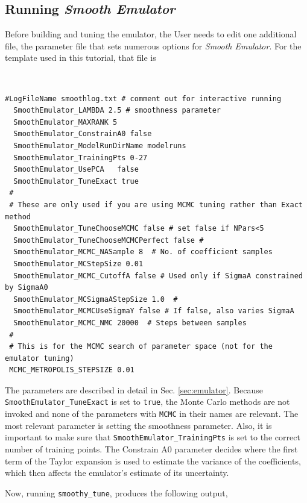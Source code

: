 \documentclass[UserManual.tex]{subfiles}
\begin{document}
\subsection{Running {\it Smooth Emulator}}
Before building and tuning the emulator, the User needs to edit one additional file, the parameter file that sets numerous options for {\it Smooth Emulator}. For the template used in this tutorial, that file is
{\tt
\begin{verbatim}
#LogFileName smoothlog.txt # comment out for interactive running
  SmoothEmulator_LAMBDA 2.5 # smoothness parameter
  SmoothEmulator_MAXRANK 5
  SmoothEmulator_ConstrainA0 false
  SmoothEmulator_ModelRunDirName modelruns
  SmoothEmulator_TrainingPts 0-27
  SmoothEmulator_UsePCA   false
  SmoothEmulator_TuneExact true
 #
 # These are only used if you are using MCMC tuning rather than Exact method
  SmoothEmulator_TuneChooseMCMC false # set false if NPars<5
  SmoothEmulator_TuneChooseMCMCPerfect false #
  SmoothEmulator_MCMC_NASample 8  # No. of coefficient samples
  SmoothEmulator_MCStepSize 0.01
  SmoothEmulator_MCMC_CutoffA false # Used only if SigmaA constrained by SigmaA0
  SmoothEmulator_MCSigmaAStepSize 1.0  #
  SmoothEmulator_MCMCUseSigmaY false # If false, also varies SigmaA
  SmoothEmulator_MCMC_NMC 20000  # Steps between samples 
 #
 # This is for the MCMC search of parameter space (not for the emulator tuning)
 MCMC_METROPOLIS_STEPSIZE 0.01
\end{verbatim}
}
The parameters are described in detail in Sec. \ref{sec:emulator}. Because {\tt SmoothEmulator\_TuneExact} is set to {\tt true}, the Monte Carlo methods are not invoked and none of the parameters with {\tt MCMC} in their names are relevant. The most relevant parameter is setting the smoothness parameter. Also, it is important to make sure that {\tt SmoothEmulator\_TrainingPts} is set to the correct number of training points. The Constrain A0 parameter decides where the first term of the Taylor expansion is used to estimate the variance of the coefficients, which then affects the emulator's estimate of its uncertainty.

Now, running {\tt smoothy\_tune}, produces the following output,
\end{document}

